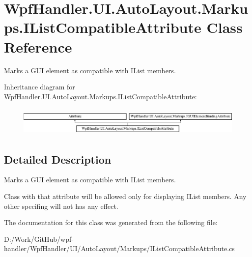 \hypertarget{class_wpf_handler_1_1_u_i_1_1_auto_layout_1_1_markups_1_1_i_list_compatible_attribute}{}\section{Wpf\+Handler.\+U\+I.\+Auto\+Layout.\+Markups.\+I\+List\+Compatible\+Attribute Class Reference}
\label{class_wpf_handler_1_1_u_i_1_1_auto_layout_1_1_markups_1_1_i_list_compatible_attribute}


Marks a G\+UI element as compatible with I\+List members.  


Inheritance diagram for Wpf\+Handler.\+U\+I.\+Auto\+Layout.\+Markups.\+I\+List\+Compatible\+Attribute\+:\begin{figure}[H]
\begin{center}
\leavevmode
\includegraphics[height=1.462141cm]{d3/df0/class_wpf_handler_1_1_u_i_1_1_auto_layout_1_1_markups_1_1_i_list_compatible_attribute}
\end{center}
\end{figure}


\subsection{Detailed Description}
Marks a G\+UI element as compatible with I\+List members. 

Class with that attribute will be allowed only for displaying I\+List members. Any other specifing will not has any effect. 

The documentation for this class was generated from the following file\+:\begin{DoxyCompactItemize}
\item 
D\+:/\+Work/\+Git\+Hub/wpf-\/handler/\+Wpf\+Handler/\+U\+I/\+Auto\+Layout/\+Markups/I\+List\+Compatible\+Attribute.\+cs\end{DoxyCompactItemize}
